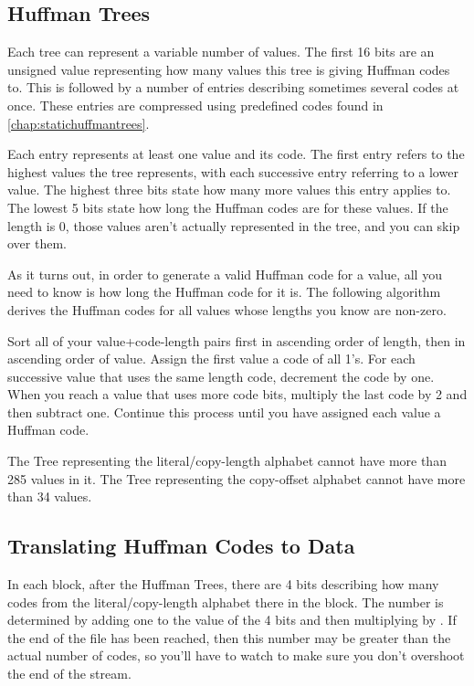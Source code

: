 \subsection{Huffman Trees}
\label{subsec:huffmantrees}

Each tree can represent a variable number of values.  The first 16 bits are an
unsigned value representing how many values this tree is giving Huffman codes
to.  This is followed by a number of entries describing sometimes several codes
at once.  These entries are compressed using predefined codes found in
\autoref{chap:statichuffmantrees}.

Each entry represents at least one value and its code.  The first entry refers
to the highest values the tree represents, with each successive entry referring
to a lower value.  The highest three bits state how many more values this entry
applies to.  The lowest 5 bits state how long the Huffman codes are for these
values.  If the length is 0, those values aren't actually represented in the
tree, and you can skip over them.

As it turns out, in order to generate a valid Huffman code for a value, all you
need to know is how long the Huffman code for it is.  The following algorithm
derives the Huffman codes for all values whose lengths you know are non-zero.

Sort all of your value+code-length pairs first in ascending order of length,
then in ascending order of value.  Assign the first value a code of all 1's.
For each successive value that uses the same length code, decrement the code by
one.  When you reach a value that uses more code bits, multiply the last code by
2 and then subtract one.  Continue this process until you have assigned each
value a Huffman code.

The Tree representing the literal/copy-length alphabet cannot have more than
285 values in it. The Tree representing the copy-offset alphabet cannot have
more than 34 values.

\subsection{Translating Huffman Codes to Data}
\label{subsec:codetodata}

In each block, after the Huffman Trees, there are 4 bits describing how many
codes from the literal/copy-length alphabet there in the block.  The number is
determined by adding one to the value of the 4 bits and then multiplying by
.  If the end of the file has been reached, then this number may be
greater than the actual number of codes, so you'll have to watch to make sure
you don't overshoot the end of the stream.

